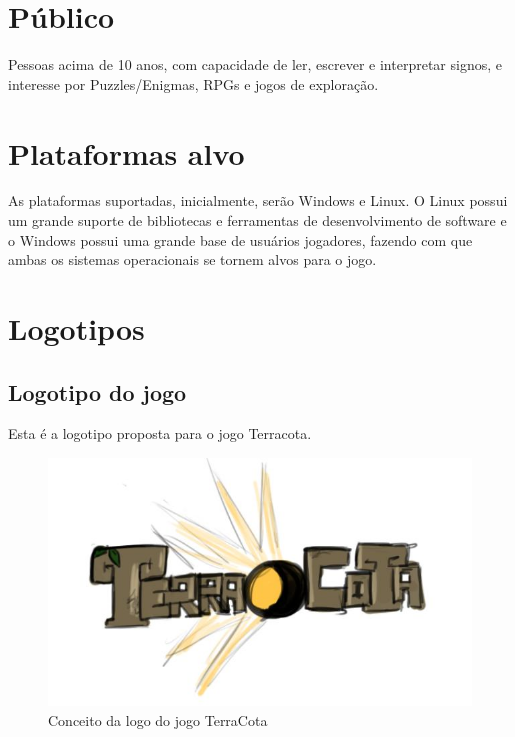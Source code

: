 \documentclass[12pt]{article}
\begin{document}
\section{Público}
Pessoas acima de 10 anos, com capacidade de ler, escrever e interpretar signos, e
interesse por Puzzles/Enigmas, RPGs e jogos de exploração.

\section{Plataformas alvo}
As plataformas suportadas, inicialmente, serão Windows e Linux.
O Linux possui um grande suporte de bibliotecas e ferramentas de desenvolvimento
de software e o Windows possui uma grande base de usuários jogadores, fazendo com
que ambas os sistemas operacionais se tornem alvos para o jogo.


\section{Logotipos}
\subsection{Logotipo do jogo}
Esta é a logotipo proposta para o jogo Terracota.
\begin{figure}[!htp]
	\centering
	\includegraphics[scale=0.5]{logo-terracota.jpg}
	\caption{Conceito da logo do jogo TerraCota}
	\label{TerraCota logo}
\end{figure}
\end{document}

